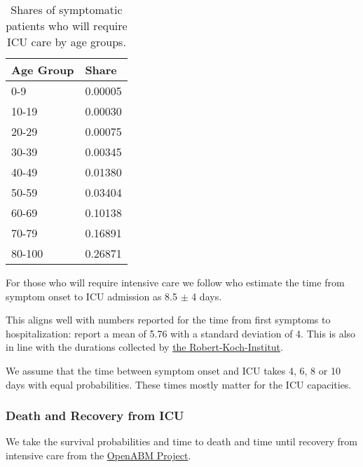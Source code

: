 \begin{table}[tb]
    \caption{Shares of symptomatic patients who will require ICU care by age groups.}
    \label{tab:symptomatic-to-ICU}
    \centering

    \begin{tabular}{ll}
        \toprule
        Age Group & Share \\
        \midrule
        0-9 & 0.00005 \\
        10-19 & 0.00030 \\
        20-29 & 0.00075 \\
        30-39 & 0.00345 \\
        40-49 & 0.01380 \\
        50-59 & 0.03404 \\
        60-69 & 0.10138 \\
        70-79 & 0.16891 \\
        80-100 & 0.26871 \\
        \bottomrule
    \end{tabular}


\end{table}

For those who will require intensive care we follow \citet{Chen2020} who estimate the
time from symptom onset to ICU admission as 8.5 $\pm$ 4 days.

This aligns well with numbers reported for the time from first symptoms to
hospitalization: \citet{Gaythorpe2020} report a mean of 5.76 with a standard deviation
of 4. This is also in line with the durations collected by
\href{https://www.rki.de/DE/Content/InfAZ/N/Neuartiges_Coronavirus/Steckbrief.html#doc13776792bodyText16}{the
Robert-Koch-Institut}.

We assume that the time between symptom onset and ICU takes 4, 6, 8 or 10 days with
equal probabilities. These times mostly matter for the ICU capacities.


\subsubsection{Death and Recovery from ICU}

We take the survival probabilities and time to death and time until recovery from
intensive care from the \href{https://tinyurl.com/y5owhyts}{OpenABM Project}.

